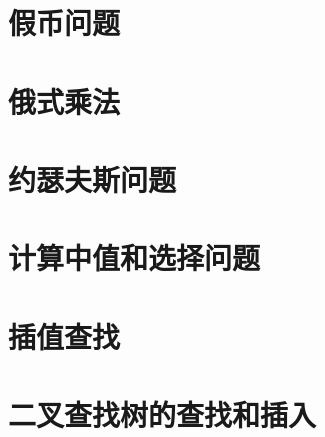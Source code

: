 \documentclass[a4paper,left=2.5cm,right=2.5cm,11pt]{article}
\begin{document}
\section{假币问题}
\section{俄式乘法}
\section{约瑟夫斯问题}
\section{计算中值和选择问题}
\section{插值查找}
\section{二叉查找树的查找和插入}
\end{document}
